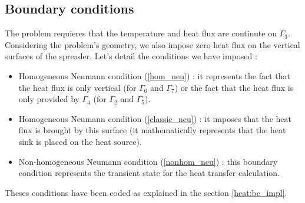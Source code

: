 \subsection{Boundary conditions}
\label{heat:bc}
The problem requieres that the temperature and heat flux are continute on $\Gamma_3$. Considering the problem's geometry, we also impose zero heat flux on the vertical surfaces of the spreader. Let's detail the conditions we have imposed :
\begin{itemize}
\item Homogeneous Neumann condition (\ref{hom_neu}) : it represents the fact that the heat flux is only vertical (for $\Gamma_6$ and $\Gamma_7$) or the fact that the heat flux is only provided by $\Gamma_4$ (for $\Gamma_2$ and $\Gamma_5$).

\item Homogeneous Neumann condition (\ref{classic_neu}) : it imposes that the heat flux is brought by this surface (it mathematically represents that the heat sink is placed on the heat source).

\item Non-homogeneous Neumann condition (\ref{nonhom_neu}) :  this boundary condition represents the transient state for the heat transfer calculation.
\end{itemize}

Theses conditions have been coded as explained in the section \ref{heat:bc_impl}.

